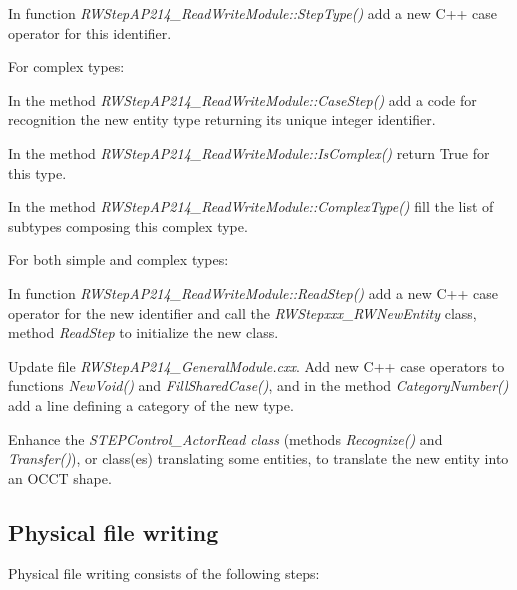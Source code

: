 \begin{DoxyItemize}
\begin{DoxyItemize}
\begin{DoxyItemize}
\item In function {\itshape R\+W\+Step\+A\+P214\+\_\+\+Read\+Write\+Module\+::\+Step\+Type()} add a new C++ case operator for this identifier.
\end{DoxyItemize}
\item For complex types\+:
\begin{DoxyItemize}
\item In the method {\itshape R\+W\+Step\+A\+P214\+\_\+\+Read\+Write\+Module\+::\+Case\+Step()} add a code for recognition the new entity type returning its unique integer identifier.
\item In the method {\itshape R\+W\+Step\+A\+P214\+\_\+\+Read\+Write\+Module\+::\+Is\+Complex()} return True for this type.
\item In the method {\itshape R\+W\+Step\+A\+P214\+\_\+\+Read\+Write\+Module\+::\+Complex\+Type()} fill the list of subtypes composing this complex type.
\end{DoxyItemize}
\item For both simple and complex types\+:
\begin{DoxyItemize}
\item In function {\itshape R\+W\+Step\+A\+P214\+\_\+\+Read\+Write\+Module\+::\+Read\+Step()} add a new C++ case operator for the new identifier and call the {\itshape R\+W\+Stepxxx\+\_\+\+R\+W\+New\+Entity} class, method {\itshape Read\+Step} to initialize the new class.
\end{DoxyItemize}
\end{DoxyItemize}
\item Update file {\itshape R\+W\+Step\+A\+P214\+\_\+\+General\+Module.\+cxx}. Add new C++ case operators to functions {\itshape New\+Void()} and {\itshape Fill\+Shared\+Case()}, and in the method {\itshape Category\+Number()} add a line defining a category of the new type.
\item Enhance the {\itshape S\+T\+E\+P\+Control\+\_\+\+Actor\+Read class} (methods {\itshape Recognize()} and {\itshape Transfer()}), or class(es) translating some entities, to translate the new entity into an O\+C\+CT shape.
\end{DoxyItemize}\hypertarget{occt_user_guides__step_occt_step_4_4}{}\subsection{Physical file writing}\label{occt_user_guides__step_occt_step_4_4}
Physical file writing consists of the following steps\+:
